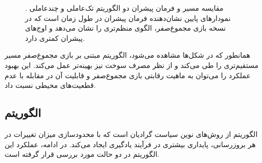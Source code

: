 \begin{figure}[H]
	\centering
	
	
	\caption{
	مقایسه مسیر و فرمان پیشران دو الگوریتم تک‌عاملی و چندعاملی .
	نمودارهای پایین نشان‌دهنده فرمان پیشران در طول زمان است که در نسخه بازی مجموع‌صفر، الگوی منظم‌تری را نشان می‌دهد و اوج‌های پیشران کمتری دارد.
	}
\end{figure}

همانطور که در شکل‌ها مشاهده می‌شود، الگوریتم  مبتنی بر بازی مجموع‌صفر مسیر مستقیم‌تری را طی می‌کند و از نظر مصرف سوخت نیز بهینه‌تر عمل می‌کند. این بهبود عملکرد را می‌توان به ماهیت رقابتی بازی مجموع‌صفر و قابلیت آن در مقابله با عدم قطعیت‌های محیطی نسبت داد.

\subsection{الگوریتم }

الگوریتم   از روش‌های نوین سیاست گرادیان است که با محدودسازی میزان تغییرات در هر بروزرسانی، پایداری بیشتری در فرآیند یادگیری ایجاد می‌کند. در ادامه، عملکرد این الگوریتم در دو حالت مورد بررسی قرار گرفته است.

